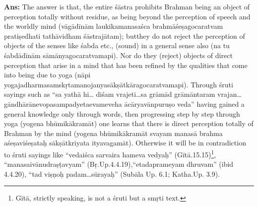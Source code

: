 \vskip -2pt

\textbf{Ans:} The answer is that, the entire śāstra prohibits Brahman being an object of perception totally without residue, as being beyond the perception of speech and the worldly mind (vāgādīnām laukikamanasaśca brahmāśeṣagocaratvam pratiṣedhati tathāvidham śāstrajātam); but\break they do not reject the perception of objects of the senses like śabda etc., (sound) in a general sense also (na tu śabdādīnām sāmānyagocaratvamapi). Nor do they (reject) objects of direct perception that arise in a mind that has been refined by the qualities that come into being due to yoga (nāpi yogajadharmasamskṛtamanojanyasākṣātkāragocaratvamapi). Through śruti sayings such as “sa yathā hi… diśam vrajeti…sa grāmād grāmāntaram vrajan…gāndhārānevopasampadyeta\break evameveha ācāryavānpuruṣo veda” having gained a general knowledge only through words, then progressing step by step through yoga (yogena bhūmikākramāt) one learns that there is direct perception totally of Brahman by the mind (yogena bhūmikākramāt svayam manasā brahma aśeṣaviśeṣataḥ sākṣātkriyata ityavagamāt). Otherwise it will be in contradiction to śruti sayings like “vedaiśca sarvaira hameva vedyaḥ” (Gītā.15.15)\footnote{Gītā, strictly speaking, is not a śruti but a smṛti text.}, “manasaivānudraṣṭavyam” (Bṛ.Up.4.4.19),\break “etadaprameyam dhruvam” (ibid 4.4.20), “tad viṣṇoḥ padam…sūrayaḥ” (Subāla Up. 6.1; Katha.Up. 3.9).

\vskip -2pt


\vskip -2pt


\vskip -2pt


